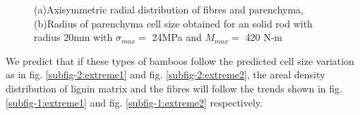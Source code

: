 \documentclass[openright,twoside]{iitkthesis}
\begin{document}
\begin{figure}[H]
\begin{center}
    \label{fig:extreme2}
    \caption{(a)Axisymmetric radial distribution of fibres and parenchyma, (b)Radius of parenchyma cell size obtained for an solid rod with radius 20mm with $\sigma_{max} = $ 24MPa and $M_{max} = $ 420 N-m}
\end{center}
\end{figure}
We predict that if these types of bamboos follow the predicted cell size variation as in fig. \ref{subfig-2:extreme1} and fig. \ref{subfig-2:extreme2}, the areal density distribution of lignin matrix and the fibres will follow the trends shown in fig. \ref{subfig-1:extreme1} and fig. \ref{subfig-1:extreme2} respectively.
\end{document}
